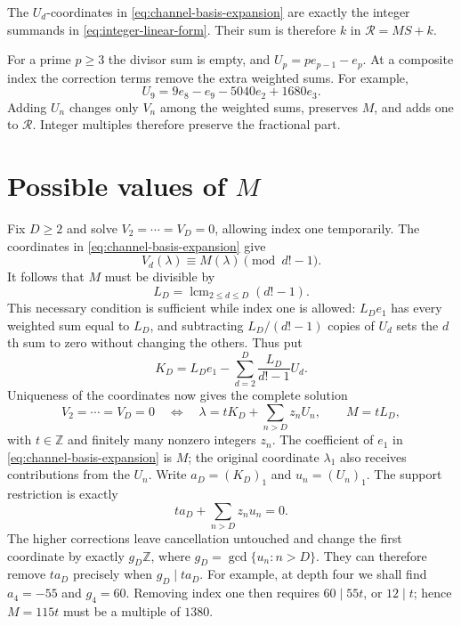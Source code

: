 \documentclass[11pt]{article}
\begin{document}
The $U_d$-coordinates in \eqref{eq:channel-basis-expansion} are exactly
the integer summands in \eqref{eq:integer-linear-form}. Their sum is
therefore $k$ in $\mathcal R=MS+k$.

For a prime $p\ge3$ the divisor sum is empty, and
$U_p=pe_{p-1}-e_p$. At a composite index the correction terms remove
the extra weighted sums. For example,
\begin{equation}
 U_9=9e_8-e_9-5040e_2+1680e_3.
 \label{res:translator}
\end{equation}
Adding $U_n$ changes only $V_n$ among the weighted sums, preserves
$M$, and adds one to $\mathcal R$. Integer multiples therefore preserve
the fractional part.

\section{Possible values of \texorpdfstring{$M$}{M}}\label{sec:moments}

Fix $D\ge2$ and solve $V_2=\cdots=V_D=0$, allowing index one
temporarily. The coordinates in \eqref{eq:channel-basis-expansion} give
\begin{equation}
 V_d(\lambda)\equiv M(\lambda)\pmod{d!-1}.
 \label{res:congruence}
\end{equation}
It follows that $M$ must be divisible by
\[
 L_D=\operatorname{lcm}_{2\le d\le D}(d!-1).
\]
This necessary condition is sufficient while index one is allowed:
$L_De_1$ has every weighted sum equal to $L_D$, and subtracting
$L_D/(d!-1)$ copies of $U_d$ sets the $d$th sum to zero without changing
the others. Thus put
\[
 K_D=L_De_1-\sum_{d=2}^D\frac{L_D}{d!-1}U_d.
\]
Uniqueness of the coordinates now gives the complete solution
\begin{equation}
 V_2=\cdots=V_D=0
 \quad\Longleftrightarrow\quad
 \lambda=tK_D+\sum_{n>D}z_nU_n,\qquad M=tL_D,
 \label{eq:low-channel-classification}
\end{equation}
with $t\in\mathbb Z$ and finitely many nonzero integers $z_n$.
The coefficient of $e_1$ in \eqref{eq:channel-basis-expansion} is $M$; the original coordinate
$\lambda_1$ also receives contributions from the $U_n$.
Write $a_D=(K_D)_1$ and $u_n=(U_n)_1$. The support restriction is exactly
\begin{equation}
 ta_D+\sum_{n>D}z_nu_n=0.
 \label{eq:support-equation}
\end{equation}
The higher corrections leave cancellation untouched and change the
first coordinate by exactly $g_D\mathbb Z$, where
$g_D=\gcd\{u_n:n>D\}$. They can therefore remove $ta_D$ precisely
when $g_D\mid ta_D$.
For example, at depth four we shall find $a_4=-55$ and $g_4=60$.
Removing index one then requires $60\mid55t$, or $12\mid t$;
hence $M=115t$ must be a multiple of $1380$.
\end{document}
